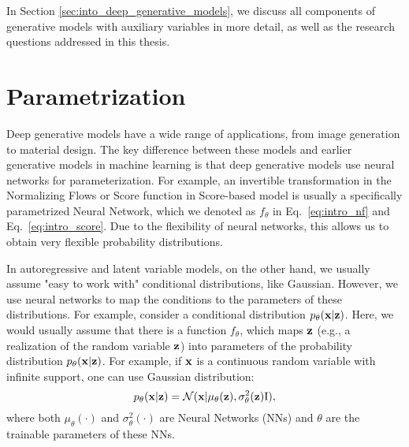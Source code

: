 In Section \ref{sec:into_deep_generative_models}, we discuss all components of generative models with auxiliary variables in more detail, as well as the research questions addressed in this thesis.




\section{Parametrization}
Deep generative models have a wide range of applications, from image generation to material design. The key difference between these models and earlier generative models in machine learning is that deep generative models use neural networks for parameterization. 
For example, an invertible transformation in the Normalizing Flows or Score function in Score-based model is usually a specifically parametrized Neural Network, which we denoted as $f_{\theta}$ in Eq.~\ref{eq:intro_nf} and Eq.~\ref{eq:intro_score}. Due to the flexibility of neural networks, this allows us to obtain very flexible probability distributions. 

In autoregressive and latent variable models, on the other hand, we usually assume "easy to work with" conditional distributions, like Gaussian. However, we use neural networks to map the conditions to the parameters of these distributions. 
For example, consider a conditional distribution $p_{\theta}({\mathbf{x}}|{\mathbf{z}})$. Here, we would usually assume that there is a function $f_{\theta}$, which maps ${\mathbf{z}}$ (e.g., a realization of the random variable ${\mathbf{z}}$) into parameters of the probability distribution $p_{\theta}({\mathbf{x}}|{\mathbf{z}})$. For example, if ${\mathbf{x}}$ is a continuous random variable with infinite support, one can use Gaussian distribution:
\begin{equation}
    p_{\theta}({\mathbf{x}}|{\mathbf{z}}) = \mathcal{N}({\mathbf{x}}| \mu_{\theta}({\mathbf{z}}), \sigma^2_{\theta}({\mathbf{z}}) \text{I}),
\end{equation}
where both $\mu_{\theta}(\cdot)$ and $\sigma^2_{\theta}(\cdot)$ are Neural Networks (NNs) and $\theta$ are the trainable parameters of these NNs. 

